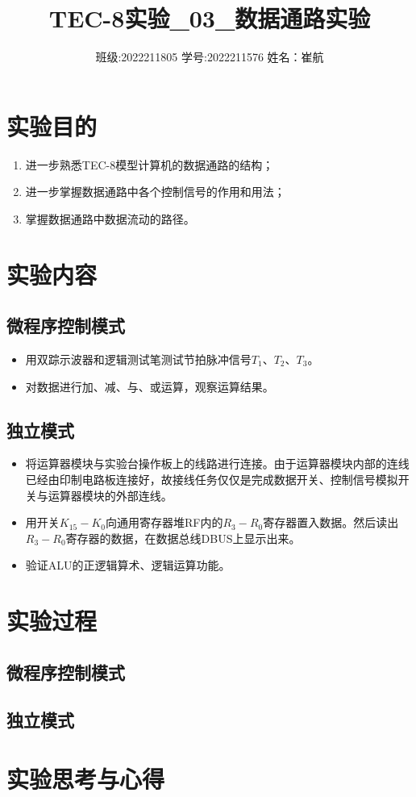\documentclass[a4paper]{article}
\title{\heiti\zihao{3} TEC-8实验\_03\_数据通路实验}
\date{班级:2022211805  学号:2022211576  姓名：崔航}
\providecommand{\keywords}[1]
{
    \small	
    \textbf{关键词:} #1
}
\providecommand{\keywords}[1]
{
  \small	
  \textbf{关键词:} #1
}
\begin{document}
    \maketitle


\tableofcontents
\section{实验目的}
\begin{enumerate}
    
    \item 进一步熟悉TEC-8模型计算机的数据通路的结构；
    \item 进一步掌握数据通路中各个控制信号的作用和用法；
    \item 掌握数据通路中数据流动的路径。
    
\end{enumerate}

\section{实验内容}
\subsection{微程序控制模式}
\begin{itemize}
    \item 用双踪示波器和逻辑测试笔测试节拍脉冲信号$T_1$、$T_2$、$T_3$。
    \item 对数据进行加、减、与、或运算，观察运算结果。
\end{itemize}
\subsection{独立模式}
\begin {itemize}
    \item 将运算器模块与实验台操作板上的线路进行连接。由于运算器模块内部的连线已经由印制电路板连接好，故接线任务仅仅是完成数据开关、控制信号模拟开关与运算器模块的外部连线。
    \item 用开关$K_{15}-K_{0}$向通用寄存器堆RF内的$R_3-R_0$寄存器置入数据。然后读出$R_3-R_0$寄存器的数据，在数据总线DBUS上显示出来。
    \item 验证ALU的正逻辑算术、逻辑运算功能。
    
\end{itemize}
\section{实验过程}
\subsection{微程序控制模式}

\subsection{独立模式}

\section{实验思考与心得}
\end{document}
